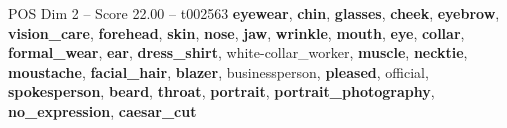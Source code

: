 \begin{textsample}{POS Dim 2 – Score 22.00 – t002563}  \label{ex:f2_pos_020}
\textbf{eyewear}, \textbf{chin}, \textbf{glasses}, \textbf{cheek}, \textbf{eyebrow}, \textbf{vision\_care}, \textbf{forehead}, \textbf{skin}, \textbf{nose}, \textbf{jaw}, \textbf{wrinkle}, \textbf{mouth}, \textbf{eye}, \textbf{collar}, \textbf{formal\_wear}, \textbf{ear}, \textbf{dress\_shirt}, white-collar\_worker, \textbf{muscle}, \textbf{necktie}, \textbf{moustache}, \textbf{facial\_hair}, \textbf{blazer}, businessperson, \textbf{pleased}, official, \textbf{spokesperson}, \textbf{beard}, \textbf{throat}, \textbf{portrait}, \textbf{portrait\_photography}, \textbf{no\_expression}, \textbf{caesar\_cut}

\end{textsample}
